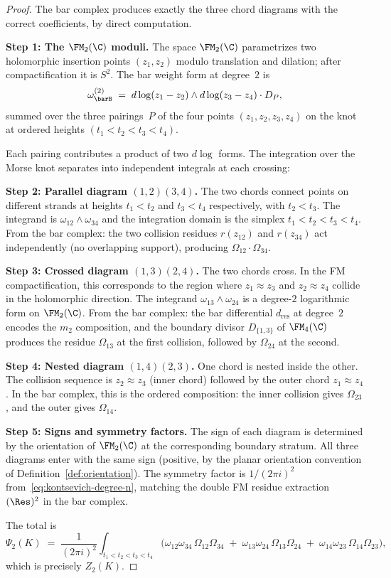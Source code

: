\begin{proof}
The bar complex produces exactly the three chord diagrams with
the correct coefficients, by direct computation.

\textbf{Step 1: The $\FM_2(\C)$ moduli.}
The space $\FM_2(\C)$ parametrizes two holomorphic insertion
points $(z_1, z_2)$ modulo translation and dilation; after
compactification it is $S^2$. The bar weight form at degree~$2$
is
\[
\omega_{\barB}^{(2)}
\;=\;
d\log(z_1 - z_2) \wedge d\log(z_3 - z_4) \cdot D_P,
\]
summed over the three pairings~$P$ of the four points
$(z_1, z_2, z_3, z_4)$ on the knot at ordered heights
$(t_1 < t_2 < t_3 < t_4)$.

Each pairing contributes a product of two $d\log$ forms.
The integration over the Morse knot separates into
independent integrals at each crossing:

\textbf{Step 2: Parallel diagram $(1,2)(3,4)$.}
The two chords connect points on different strands at heights
$t_1 < t_2$ and $t_3 < t_4$ respectively, with
$t_2 < t_3$. The integrand is
$\omega_{12} \wedge \omega_{34}$ and the integration domain is
the simplex $t_1 < t_2 < t_3 < t_4$. From the bar complex:
the two collision residues $r(z_{12})$ and $r(z_{34})$ act
independently (no overlapping support), producing
$\Omega_{12} \cdot \Omega_{34}$.

\textbf{Step 3: Crossed diagram $(1,3)(2,4)$.}
The two chords cross. In the FM compactification, this
corresponds to the region where
$z_1 \approx z_3$ and $z_2 \approx z_4$ collide in the
holomorphic direction. The integrand
$\omega_{13} \wedge \omega_{24}$ is a degree-$2$ logarithmic
form on $\FM_2(\C)$. From the bar complex: the bar differential
$d_{\mathrm{res}}$ at degree~$2$ encodes the $m_2$ composition,
and the boundary divisor $D_{\{1,3\}}$ of $\FM_4(\C)$ produces
the residue $\Omega_{13}$ at the first collision, followed by
$\Omega_{24}$ at the second.

\textbf{Step 4: Nested diagram $(1,4)(2,3)$.}
One chord is nested inside the other. The collision sequence
is $z_2 \approx z_3$ (inner chord) followed by the outer
chord $z_1 \approx z_4$. In the bar complex, this is the
ordered composition: the inner collision gives
$\Omega_{23}$, and the outer gives $\Omega_{14}$.

\textbf{Step 5: Signs and symmetry factors.}
The sign of each diagram is determined by the orientation of
$\FM_2(\C)$ at the corresponding boundary stratum. All three
diagrams enter with the same sign (positive, by the planar
orientation convention of
Definition~\ref{def:orientation}). The symmetry factor is
$1/(2\pi i)^2$ from~\eqref{eq:kontsevich-degree-n}, matching
the double FM residue extraction $(\Res)^2$ in the bar
complex.

The total is
\[
\Psi_2(K)
\;=\;
\frac{1}{(2\pi i)^2}
\int_{t_1 < t_2 < t_3 < t_4}
\bigl(\omega_{12}\omega_{34}\,\Omega_{12}\Omega_{34}
\;+\; \omega_{13}\omega_{24}\,\Omega_{13}\Omega_{24}
\;+\; \omega_{14}\omega_{23}\,\Omega_{14}\Omega_{23}\bigr),
\]
which is precisely $Z_2(K)$.
\end{proof}

